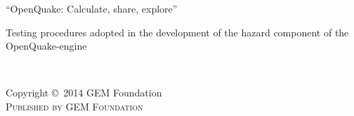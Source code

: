 \documentclass[11pt,fleqn]{book} %
\begin{document}



\begingroup
\thispagestyle{empty}
\par\normalfont\fontsize{15}{15}\sffamily\selectfont
“OpenQuake: Calculate, share, explore”
\centering
\vspace*{9cm}
\par\normalfont\fontsize{35}{35}\sffamily\selectfont
Testing procedures adopted in the development of the hazard 
component of the OpenQuake-engine\par %
\endgroup


\newpage
~\vfill
\thispagestyle{empty}

\noindent Copyright \copyright\ 2014 GEM Foundation\\ %

\noindent \textsc{Published by GEM Foundation}\\ %
\end{document}
